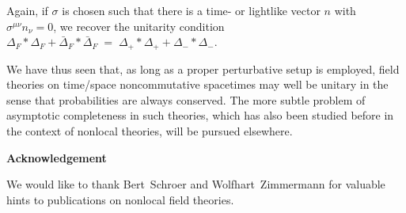 \documentclass[a4paper,twoside,12pt]{article}
\begin{document}
Again, if $\sigma$ is chosen such that there is a  time- or lightlike vector
$n$ with $\sigma^{\mu\nu}n_\nu=0$, we recover the unitarity condition
$\Delta_F*\Delta_F + \bar \Delta_F*\bar\Delta_F \;=\;
\Delta_+*\Delta_++\Delta_-*\Delta_- $.


We have thus seen that, as long as a proper perturbative setup is
employed, field theories on time/space noncommutative spacetimes may well be
unitary in the sense that probabilities are always conserved. The more subtle
problem of asymptotic completeness in such theories, which has also been
studied before in the context of nonlocal theories, will be pursued elsewhere.

\vspace{4ex}\noindent
{\bf Acknowledgement}

\noindent 
We would like to thank Bert~Schroer and Wolfhart~Zimmermann for valuable hints
to publications on nonlocal field theories.
\end{document}
